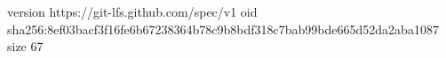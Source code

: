 version https://git-lfs.github.com/spec/v1
oid sha256:8ef03bacf3f16fe6b67238364b78c9b8bdf318c7bab99bde665d52da2aba1087
size 67
